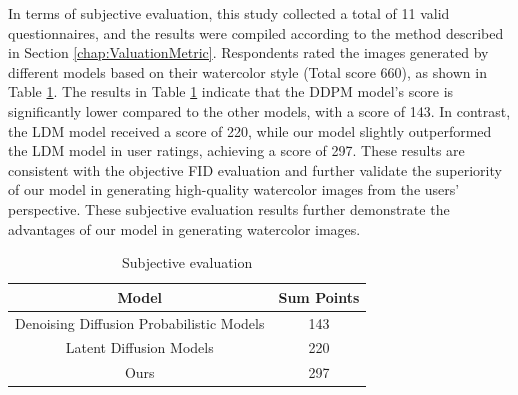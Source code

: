 \documentclass[12pt]{report}
\begin{document}
In terms of subjective evaluation, this study collected a total of 11 valid questionnaires, and the results were compiled according to the method described in Section \ref{chap:ValuationMetric}. Respondents rated the images generated by different models based on their watercolor style (Total score 660), as shown in Table \ref{tab:point}. The results in Table \ref{tab:point} indicate that the DDPM model's score is significantly lower compared to the other models, with a score of 143. In contrast, the LDM model received a score of 220, while our model slightly outperformed the LDM model in user ratings, achieving a score of 297. These results are consistent with the objective FID evaluation and further validate the superiority of our model in generating high-quality watercolor images from the users' perspective. These subjective evaluation results further demonstrate the advantages of our model in generating watercolor images.
\begin{table}[htbp]
  \centering
  \caption{Subjective evaluation}
  \label{tab:point}
  \begin{tabular}{c c}
    \hline
    Model & Sum Points  \\
    \hline
    Denoising Diffusion Probabilistic Models & 143  \\
    Latent Diffusion Models & 220  \\
    Ours & 297  \\
    \hline
  \end{tabular}
\end{table}

\end{document}

